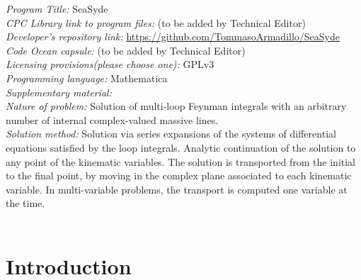 \documentclass[final,1p,times]{elsarticle}
\begin{document}
\begin{small}
\noindent
{\em Program Title:}  {\textsc SeaSyde}                                        \\
{\em CPC Library link to program files:} (to be added by Technical Editor) \\
{\em Developer's repository link:}   \url{https://github.com/TommasoArmadillo/SeaSyde}     \\
{\em Code Ocean capsule:} (to be added by Technical Editor)\\
{\em Licensing provisions(please choose one):} GPLv3  \\
{\em Programming language:}   {\textsc  Mathematica  }                                \\
{\em Supplementary material:}                                 \\
{\em Nature of problem:}  Solution of multi-loop Feynman integrals with an arbitrary number of internal complex-valued massive lines. \\
{\em Solution method:}  Solution via series expansions of the systems of differential equations satisfied by the loop integrals.
Analytic continuation of the solution to any point of the kinematic variables. The solution is transported from the initial to the final point, by moving in the complex plane associated to each kinematic variable. In multi-variable problems, the transport is computed one variable at the time.    \\
   \\


\end{small}




\section{Introduction}
\label{sec:intro}
\end{document}
